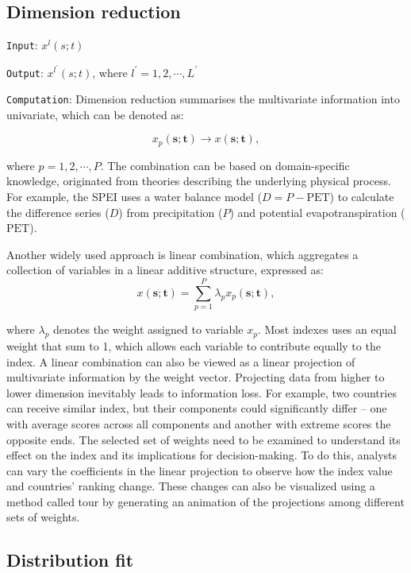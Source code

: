 \documentclass[
]{interact}
\begin{document}
\hypertarget{dimension-reduction}{%
\subsection{Dimension reduction}\label{dimension-reduction}}

\texttt{Input}: \(x^l(s; t)\)

\texttt{Output}: \(x^{l^\prime}(s; t)\), where
\(l^{\prime} = 1, 2, \cdots, L^{\prime}\)

\texttt{Computation}: Dimension reduction summarises the multivariate
information into univariate, which can be denoted as:

\begin{equation}
x_p(\mathbf{s}; \mathbf{t}) \rightarrow x(\mathbf{s}; \mathbf{t}),
\end{equation}

where \(p = 1, 2, \cdots, P\). The combination can be based on
domain-specific knowledge, originated from theories describing the
underlying physical process. For example, the SPEI uses a water balance
model (\(D = P - \text{PET}\)) to calculate the difference series
(\(D\)) from precipitation (\(P\)) and potential evapotranspiration
(\(\text{PET}\)).

Another widely used approach is linear combination, which aggregates a
collection of variables in a linear additive structure, expressed as:
\[x(\mathbf{s}; \mathbf{t}) = \sum_{p = 1}^{P}\lambda_{p}x_p(\mathbf{s};\mathbf{t}),\]

where \(\lambda_p\) denotes the weight assigned to variable \(x_p\).
Most indexes uses an equal weight that sum to 1, which allows each
variable to contribute equally to the index. A linear combination can
also be viewed as a linear projection of multivariate information by the
weight vector. Projecting data from higher to lower dimension inevitably
leads to information loss. For example, two countries can receive
similar index, but their components could significantly differ -- one
with average scores across all components and another with extreme
scores the opposite ends. The selected set of weights need to be
examined to understand its effect on the index and its implications for
decision-making. To do this, analysts can vary the coefficients in the
linear projection to observe how the index value and countries' ranking
change. These changes can also be visualized using a method called tour
by generating an animation of the projections among different sets of
weights.

\hypertarget{distribution-fit}{%
\subsection{Distribution fit}\label{distribution-fit}}
\end{document}
